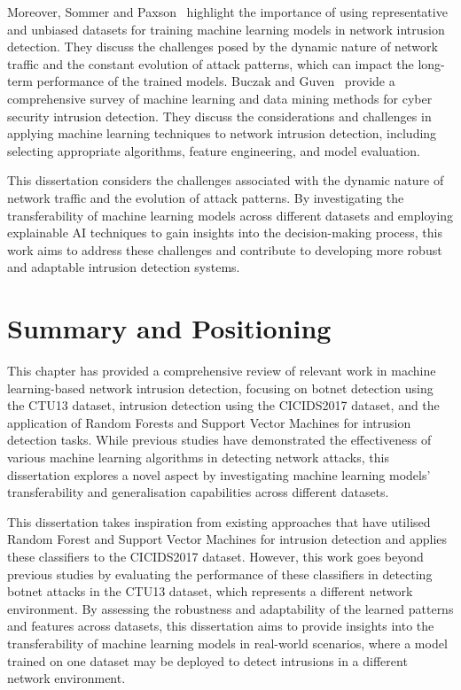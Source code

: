 Moreover, Sommer and Paxson~\cite{sommer2010outside} highlight the importance of using representative and unbiased datasets for training machine learning models in network intrusion detection. They discuss the challenges posed by the dynamic nature of network traffic and the constant evolution of attack patterns, which can impact the long-term performance of the trained models. Buczak and Guven~\cite{buczak2015survey} provide a comprehensive survey of machine learning and data mining methods for cyber security intrusion detection. They discuss the considerations and challenges in applying machine learning techniques to network intrusion detection, including selecting appropriate algorithms, feature engineering, and model evaluation.

This dissertation considers the challenges associated with the dynamic nature of network traffic and the evolution of attack patterns. By investigating the transferability of machine learning models across different datasets and employing explainable AI techniques to gain insights into the decision-making process, this work aims to address these challenges and contribute to developing more robust and adaptable intrusion detection systems.

\section{Summary and Positioning}\label{sec:PositioningSummary}

This chapter has provided a comprehensive review of relevant work in machine learning-based network intrusion detection, focusing on botnet detection using the CTU13 dataset, intrusion detection using the CICIDS2017 dataset, and the application of Random Forests and Support Vector Machines for intrusion detection tasks. While previous studies have demonstrated the effectiveness of various machine learning algorithms in detecting network attacks, this dissertation explores a novel aspect by investigating machine learning models’ transferability and generalisation capabilities across different datasets.

This dissertation takes inspiration from existing approaches that have utilised Random Forest and Support Vector Machines for intrusion detection and applies these classifiers to the CICIDS2017 dataset. However, this work goes beyond previous studies by evaluating the performance of these classifiers in detecting botnet attacks in the CTU13 dataset, which represents a different network environment. By assessing the robustness and adaptability of the learned patterns and features across datasets, this dissertation aims to provide insights into the transferability of machine learning models in real-world scenarios, where a model trained on one dataset may be deployed to detect intrusions in a different network environment.

